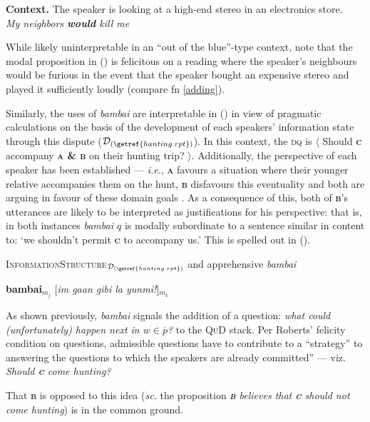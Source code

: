 \pex\textbf{Context.} The speaker is looking at a high-end stereo in an electronics store.\\
\textit{My neighbors \textbf{would} kill me}
\xe

\noindent While likely uninterpretable in an ``out of the blue''-type context, note that the modal proposition in (\lastx) is felicitous on a reading where the speaker's neighbours would be furious in the event that the speaker bought an expensive stereo and played it sufficiently loudly (compare fn \ref{adding}).


Similarly, the uses of \textit{bambai} are interpretable in () in view of pragmatic calculations on the basis of the development of each speakers' information state through this dispute ($ \mathcal D_{(\getref{hanting.rpt})} $). In this context, the \textsc{dq} is $ \langle $ Should \textbf{\textsc{c}} accompany \textbf{\textsc{a \& b}} on their hunting trip? $ \rangle $. Additionally, the perspective of each speaker has been established --- \textit{i.e.}, \textbf{\textsc{a}} favours a situation where their younger relative accompanies them on the hunt, \textbf{\textsc{b}} disfavours this eventuality and both are arguing in favour of these domain goals \citep[compare][215]{Roberts2004}. As a consequence of this, both of \textbf{\textsc{b}}'s utterances are likely to be interpreted as justifications for his perspective: that is, in both instances \textit{bambai $ q $} is modally subordinate to a sentence similar in content to: `we shouldn't permit \textbf{\textsc{c}} to accompany us.' This is spelled out in (\nextx).

\pex[labelformat=$\boldsymbol m_A$,pexcnt=106]  \textsc{InformationStructure}$ _{\mathcal D_{(\getref{hanting.rpt})}} $ and apprehensive \emph{bambai}

\textbf{bambai}$ _{m_j} $ [\textit{im gaan gibi la yunmi!}]$_{m_k}$

\a As shown previously, \textit{bambai} signals the addition of a question: \textit{what could (unfortunately) happen next in $ w\in\overline p $?} to the \textsc{QuD} stack. Per Roberts' felicity condition on questions, admissible questions have to contribute to a ``strategy'' to answering the questions to which the speakers are already committed'' --- viz. \textit{Should \textbf{\textsc{c}} come hunting?}

That \textbf{\textsc{b}} is opposed to this idea (\textit{sc.} the proposition \textit{\textbf{\textsc{b}} believes that \textbf{\textsc{c}} should not come hunting}) is in the common ground.

